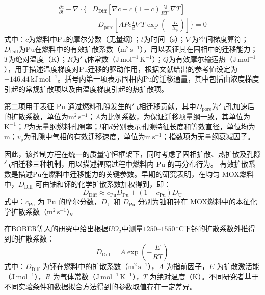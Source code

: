 \begin{equation}
	\begin{aligned}
		\frac{\partial c}{\partial t}
		-\nabla\cdot\Biggl\{
		&D_{\mathrm{Diff}}\left[\nabla c+c(1-c)\frac{Q}{RT^{2}}\nabla T\right]\\
		&-D_{\mathrm{pore}}\left[APc\frac{l}{d}\nabla T
		\exp\left(-\frac{D}{lv_{\mathrm p}}\right)\right]
		\Biggr\}=0
	\end{aligned}
\end{equation}
\noindent 式中：$c$为燃料中Pu的摩尔分数（无量纲）；$t$为时间（$\mathrm{s}$）；$\nabla$为空间梯度算符；$D_{\mathrm{Diff}}$为Pu在燃料中的有效扩散系数（$\mathrm{m^2\,s^{-1}}$），用以表征其在固相中的迁移能力；$T$为绝对温度（$\mathrm{K}$）；$R$为气体常数（$\mathrm{J\,mol^{-1}\,K^{-1}}$）；$Q$为有效摩尔输运热（$\mathrm{J\,mol^{-1}}$），用于描述温度梯度对Pu迁移的驱动作用，根据文献\cite{ishiiInvestigationPuMigration2001,clementPlutoniumRedistributionMixed1978}给出的参考值设定为$-146.44\,\mathrm{kJ\,mol^{-1}}$。括号内第一项表示固相内Pu的迁移通量，其中包括由浓度梯度引起的常规扩散项以及由温度梯度引起的热扩散项。

第二项用于表征 Pu 通过燃料孔隙发生的气相迁移贡献，其中$D_{\mathrm{pore}}$为气孔加速后的扩散系数，单位为$\mathrm{m^2\,s^{-1}}$；$A$为比例系数，为保证迁移项量纲一致，其单位为$\mathrm{K^{-1}}$；$P$为无量纲燃料孔隙率；$l$和$d$分别表示孔隙特征长度和等效直径，单位均为$\mathrm{m}$；$v_{\mathrm p}$为孔隙中气相的有效迁移速度，单位为$\mathrm{m\,s^{-1}}$；指数项为无量纲衰减因子。

因此，该控制方程在统一的质量守恒框架下，同时考虑了固相扩散、热扩散及孔隙气相迁移三种机制，用以描述辐照过程中燃料内 Pu 的再分布行为。
有效扩散系数是描述Pu在燃料中迁移能力的关键参数。早期的研究表明\cite{boberPlutoniumRedistributionFast1973}，在均匀 MOX燃料中，$D_{\mathrm{Diff}}$ 可由铀和钚的化学扩散系数加权得到，即：
\begin{equation}
	D_{\mathrm{Diff}} \approx c_{\mathrm{Pu}} D_{\mathrm{Pu}} + (1 - c_{\mathrm{Pu}}) D_{\mathrm{U}}
\end{equation}
\noindent 式中：$c_{\mathrm{Pu}}$ 为 Pu 的摩尔分数，$D_{\mathrm{U}}$ 和 $D_{\mathrm{Pu}}$ 分别为铀和钚在 MOX燃料中的本征化学扩散系数（$\mathrm{m^2\,s^{-1}}$）。

在BOBER等人\cite{clementPlutoniumRedistributionMixed1978,boberPlutoniumRedistributionFast1973}的研究中给出根据$UO_2$中测量$1250$--$1550\,{}^\circ\mathrm{C}$下钚的扩散系数外推得到的扩散系数：
\begin{equation}
	D_{\mathrm{Diff}} = A\exp\!\left(-\frac{E}{RT}\right)
\end{equation}
\noindent 式中：$D_{\mathrm{Diff}}$ 为钚在燃料中的扩散系数（$\mathrm{m^2\,s^{-1}}$），$A$ 为指前因子，$E$ 为扩散激活能（$\mathrm{J\,mol^{-1}}$），$R$ 为气体常数（$\mathrm{J\,mol^{-1}\,K^{-1}}$），$T$ 为绝对温度（$\mathrm{K}$）。不同研究者基于不同实验条件和数据拟合方法得到的参数取值存在一定差异。


